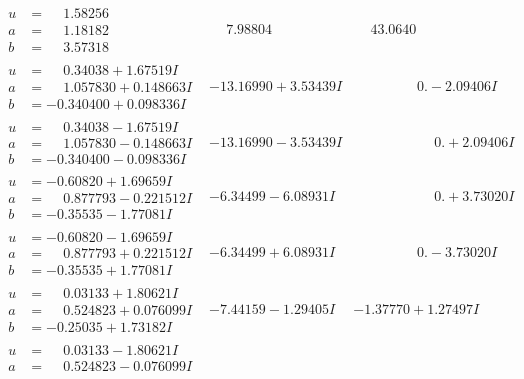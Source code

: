 \documentclass[1p]{elsarticle_modified}
\theoremstyle{definition}
\begin{document}
$$\begin{array}{c|c|c}
\begin{aligned}
u &= \phantom{-}1.58256\phantom{ +0.000000I} \\
a &= \phantom{-}1.18182\phantom{ +0.000000I} \\
b &= \phantom{-}3.57318\phantom{ +0.000000I}\end{aligned}
 & \phantom{-}7.98804\phantom{ +0.000000I} & \phantom{-}43.0640\phantom{ +0.000000I} \\ \hline\begin{aligned}
u &= \phantom{-}0.34038 + 1.67519 I \\
a &= \phantom{-}1.057830 + 0.148663 I \\
b &= -0.340400 + 0.098336 I\end{aligned}
 & -13.16990 + 3.53439 I & \phantom{-0.000000 } 0. - 2.09406 I \\ \hline\begin{aligned}
u &= \phantom{-}0.34038 - 1.67519 I \\
a &= \phantom{-}1.057830 - 0.148663 I \\
b &= -0.340400 - 0.098336 I\end{aligned}
 & -13.16990 - 3.53439 I & \phantom{-0.000000 -}0. + 2.09406 I \\ \hline\begin{aligned}
u &= -0.60820 + 1.69659 I \\
a &= \phantom{-}0.877793 - 0.221512 I \\
b &= -0.35535 - 1.77081 I\end{aligned}
 & -6.34499 - 6.08931 I & \phantom{-0.000000 -}0. + 3.73020 I \\ \hline\begin{aligned}
u &= -0.60820 - 1.69659 I \\
a &= \phantom{-}0.877793 + 0.221512 I \\
b &= -0.35535 + 1.77081 I\end{aligned}
 & -6.34499 + 6.08931 I & \phantom{-0.000000 } 0. - 3.73020 I \\ \hline\begin{aligned}
u &= \phantom{-}0.03133 + 1.80621 I \\
a &= \phantom{-}0.524823 + 0.076099 I \\
b &= -0.25035 + 1.73182 I\end{aligned}
 & -7.44159 - 1.29405 I & -1.37770 + 1.27497 I \\ \hline\begin{aligned}
u &= \phantom{-}0.03133 - 1.80621 I \\
a &= \phantom{-}0.524823 - 0.076099 I \\

\end{aligned}
\end{array}$$
\end{document}
